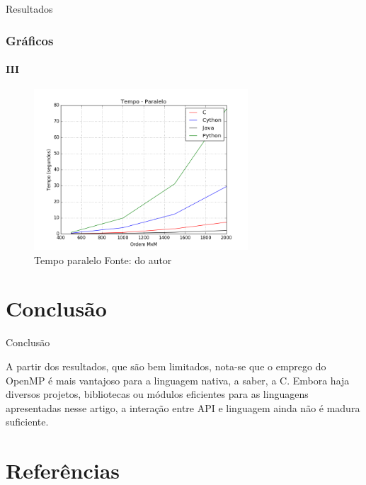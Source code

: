 \documentclass[aspectratio=169]{beamer}
\begin{document}
\begin{frame}{Resultados}
\frametitle{Gráficos}
\framesubtitle{III}

\begin{figure}
  \centering
  \includegraphics[width=8cm]{pictures/tempo_paralelo.png}
  \caption{Tempo paralelo {\small Fonte: do autor}}
\end{figure}

\end{frame}


\section{Conclusão}
\begin{frame}{Conclusão}

A partir dos resultados, que são bem limitados, nota-se que o emprego do OpenMP é mais vantajoso para a linguagem nativa, a saber, a C. Embora haja diversos projetos, bibliotecas ou módulos eficientes para as linguagens apresentadas nesse artigo, a interação entre API e linguagem ainda não é madura suficiente.

\end{frame}



\section{Referências}

\end{document}
